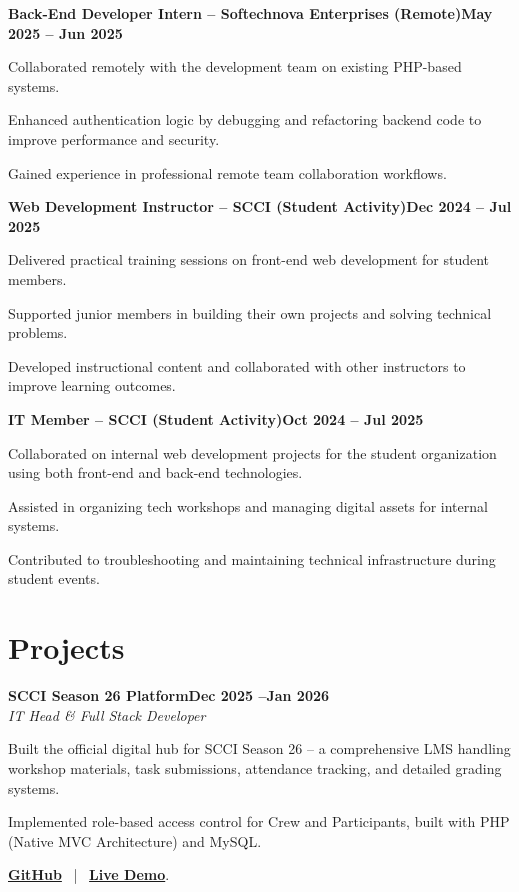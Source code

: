 \documentclass[letterpaper,10pt]{article}
\newcommand{\headingBf}[2]{\hspace{10pt}\textbf{#1}\hfill\textbf{#2}\\}
\newcommand{\headingIt}[2]{\hspace{10pt}\textit{#1}\hfill\textit{#2}\\}
\newenvironment{resume_list}{
  \vspace{-7pt}
  \begin{itemize}[itemsep=-2px, parsep=1pt, leftmargin=30pt]
}{
  \end{itemize}
}
\begin{document}
\headingBf{Back-End Developer Intern -- Softechnova Enterprises (Remote)}{May 2025 -- Jun 2025}
\begin{resume_list}
  \item Collaborated remotely with the development team on existing PHP-based systems.
  \item Enhanced authentication logic by debugging and refactoring backend code to improve performance and security.
  \item Gained experience in professional remote team collaboration workflows.
\end{resume_list}

\headingBf{Web Development Instructor -- SCCI (Student Activity)}{Dec 2024 -- Jul 2025}
\begin{resume_list}
  \item Delivered practical training sessions on front-end web development for student members.
  \item Supported junior members in building their own projects and solving technical problems.
  \item Developed instructional content and collaborated with other instructors to improve learning outcomes.
\end{resume_list}

\headingBf{IT Member -- SCCI (Student Activity)}{Oct 2024 -- Jul 2025}
\begin{resume_list}
  \item Collaborated on internal web development projects for the student organization using both front-end and back-end technologies.
  \item Assisted in organizing tech workshops and managing digital assets for internal systems.
  \item Contributed to troubleshooting and maintaining technical infrastructure during student events.
\end{resume_list}

\section{Projects}

\headingBf{SCCI Season 26 Platform}{Dec 2025 --Jan 2026}
\headingIt{IT Head \& Full Stack Developer}{}
\begin{resume_list}
  \item Built the official digital hub for SCCI Season 26 -- a comprehensive LMS handling workshop materials, task submissions, attendance tracking, and detailed grading systems.
  \item Implemented role-based access control for Crew and Participants, built with PHP (Native MVC Architecture) and MySQL.
  \item \href{https://github.com/mahmoud530/SCCI-Season26-Platform}{\textbf{GitHub}} ~|~ \href{https://scci26.site/}{\textbf{Live Demo}}.
\end{resume_list}
\end{document}
